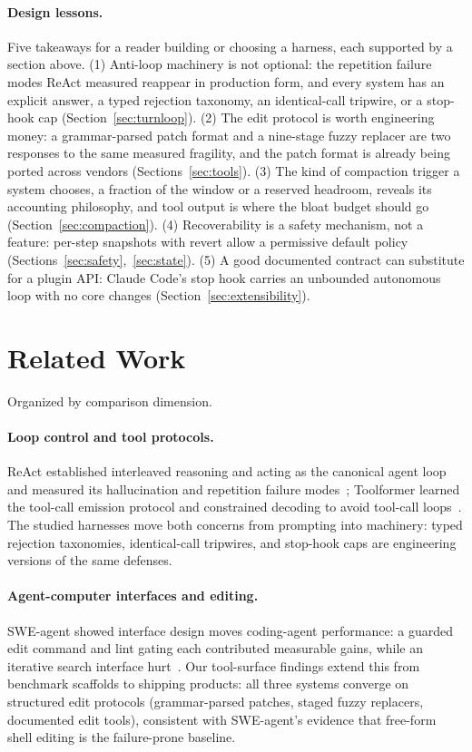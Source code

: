 \documentclass{article}
\newcommand{\ccc}[0]{Claude Code}
\begin{document}
\paragraph{Design lessons.} Five takeaways for a reader building or
choosing a harness, each supported by a section above. (1) Anti-loop
machinery is not optional: the repetition failure modes ReAct measured
reappear in production form, and every system has an explicit answer, a
typed rejection taxonomy, an identical-call tripwire, or a stop-hook cap
(Section~\ref{sec:turnloop}). (2) The edit protocol is worth engineering
money: a grammar-parsed patch format and a nine-stage fuzzy replacer are
two responses to the same measured fragility, and the patch format is
already being ported across vendors
(Sections~\ref{sec:tools}). (3) The kind of compaction trigger a system
chooses, a fraction of the window or a reserved headroom, reveals its
accounting philosophy, and tool output is where the bloat budget should
go (Section~\ref{sec:compaction}). (4) Recoverability is a safety
mechanism, not a feature: per-step snapshots with revert allow a
permissive default policy
(Sections~\ref{sec:safety},~\ref{sec:state}). (5) A good documented
contract can substitute for a plugin API: \ccc{}'s stop hook carries an
unbounded autonomous loop with no core changes
(Section~\ref{sec:extensibility}).

\section{Related Work}
\label{sec:related}

Organized by comparison dimension.

\paragraph{Loop control and tool protocols.} ReAct established interleaved
reasoning and acting as the canonical agent loop and measured its
hallucination and repetition failure modes~\citep{yao2023react}; Toolformer
learned the tool-call emission protocol and constrained decoding to avoid
tool-call loops~\citep{schick2023toolformer}. The studied harnesses move
both concerns from prompting into machinery: typed rejection taxonomies,
identical-call tripwires, and stop-hook caps are engineering versions of
the same defenses.

\paragraph{Agent-computer interfaces and editing.} SWE-agent showed
interface design moves coding-agent performance: a guarded edit command and
lint gating each contributed measurable gains, while an iterative search
interface hurt~\citep{yang2024sweagent}. Our tool-surface findings extend
this from benchmark scaffolds to shipping products: all three systems
converge on structured edit protocols (grammar-parsed patches, staged
fuzzy replacers, documented edit tools), consistent with SWE-agent's
evidence that free-form shell editing is the failure-prone baseline.
\end{document}
